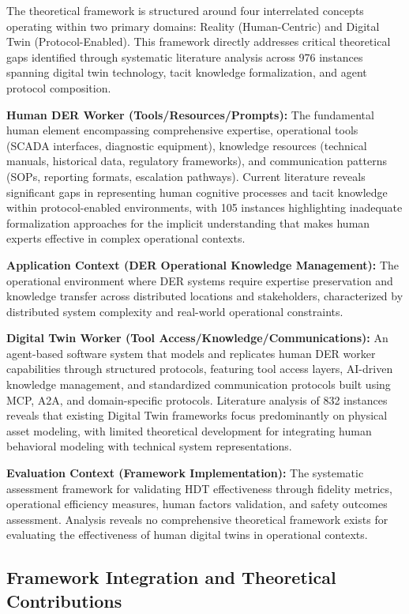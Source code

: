 \documentclass[12pt,a4paper]{article}
\begin{document}
The theoretical framework is structured around four interrelated concepts operating within two primary domains: Reality (Human-Centric) and Digital Twin (Protocol-Enabled). This framework directly addresses critical theoretical gaps identified through systematic literature analysis across 976 instances spanning digital twin technology, tacit knowledge formalization, and agent protocol composition.

\textbf{Human DER Worker (Tools/Resources/Prompts):} The fundamental human element encompassing comprehensive expertise, operational tools (SCADA interfaces, diagnostic equipment), knowledge resources (technical manuals, historical data, regulatory frameworks), and communication patterns (SOPs, reporting formats, escalation pathways). Current literature reveals significant gaps in representing human cognitive processes and tacit knowledge within protocol-enabled environments, with 105 instances highlighting inadequate formalization approaches for the implicit understanding that makes human experts effective in complex operational contexts.

\textbf{Application Context (DER Operational Knowledge Management):} The operational environment where DER systems require expertise preservation and knowledge transfer across distributed locations and stakeholders, characterized by distributed system complexity and real-world operational constraints.

\textbf{Digital Twin Worker (Tool Access/Knowledge/Communications):} An agent-based software system that models and replicates human DER worker capabilities through structured protocols, featuring tool access layers, AI-driven knowledge management, and standardized communication protocols built using MCP, A2A, and domain-specific protocols. Literature analysis of 832 instances reveals that existing Digital Twin frameworks focus predominantly on physical asset modeling, with limited theoretical development for integrating human behavioral modeling with technical system representations.

\textbf{Evaluation Context (Framework Implementation):} The systematic assessment framework for validating HDT effectiveness through fidelity metrics, operational efficiency measures, human factors validation, and safety outcomes assessment. Analysis reveals no comprehensive theoretical framework exists for evaluating the effectiveness of human digital twins in operational contexts.

\subsection{Framework Integration and Theoretical Contributions}
\end{document}
